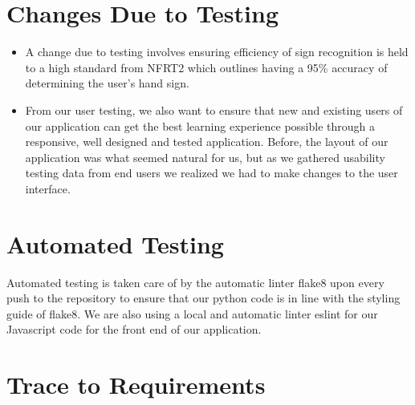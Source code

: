 \documentclass[12pt, titlepage]{article}
\begin{document}
\section{Changes Due to Testing}

\begin{itemize}

    \item A change due to testing involves ensuring efficiency of sign recognition is held to a high standard from NFRT2 which outlines having a 95\% accuracy of determining the user's hand sign.

    \item From our user testing, we also want to ensure that new and existing users of our application can get the best learning experience possible through a responsive, well designed and tested application. Before, the layout of our application was what seemed natural for us, but as we gathered usability testing data from end users we realized we had to make changes to the user interface.
\end{itemize}

\section{Automated Testing}

Automated testing is taken care of by the automatic linter flake8 upon every push to the repository to ensure that our python code is in line with the styling guide of flake8. We are also using a local and automatic linter eslint for our Javascript code for the front end of our application. 

\section{Trace to Requirements}
\end{document}
